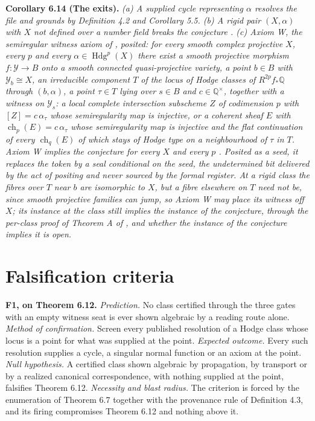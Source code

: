 \documentclass[10pt,twocolumn]{article}
\begin{document}
\textbf{Corollary 6.14 (The exits).} \emph{(a) A supplied cycle
representing \(\alpha\) resolves the file and grounds by Definition 4.2
and Corollary 5.5. (b) A rigid pair \((X,\alpha)\) with \(X\) not
defined over a number field breaks the conjecture \cite{voisin2016}. (c)
Axiom W, the semiregular witness axiom of \cite{islam2026w}, posited:
for every smooth complex projective \(X\), every \(p\) and every
\(\alpha\in\operatorname{Hdg}^p(X)\) there exist a smooth projective
morphism \(f\colon\mathcal{Y}\to B\) onto a smooth connected
quasi-projective variety, a point \(b\in B\) with
\(\mathcal{Y}_b\cong X\), an irreducible component \(T\) of the locus of
Hodge classes of \(R^{2p}f_*\mathbb{Q}\) through \((b,\alpha)\), a point
\(\tau\in T\) lying over \(s\in B\) and \(c\in\mathbb{Q}^\times\),
together with a witness on \(\mathcal{Y}_s\): a local complete
intersection subscheme \(Z\) of codimension \(p\) with
\([Z]=c\,\alpha_\tau\) whose semiregularity map is injective, or a
coherent sheaf \(E\) with \(\operatorname{ch}_p(E)=c\,\alpha_\tau\)
whose semiregularity map is injective and the flat continuation of every
\(\operatorname{ch}_q(E)\) of which stays of Hodge type on a
neighbourhood of \(\tau\) in \(T\). Axiom W implies the conjecture for
every \(X\) and every \(p\) \cite{islam2026w}. Posited as a seed, it
replaces the token by a seal conditional on the seed, the undetermined
bit delivered by the act of positing and never sourced by the formal
register. At a rigid class the fibres over \(T\) near \(b\) are
isomorphic to \(X\), but a fibre elsewhere on \(T\) need not be, since
smooth projective families can jump, so Axiom W may place its witness
off \(X\); its instance at the class still implies the instance of the
conjecture, through the per-class proof of Theorem A of
\cite{islam2026w}, and whether the instance of the conjecture implies it
is open.}

\hypertarget{falsification-criteria}{%
\section{Falsification criteria}\label{falsification-criteria}}

\textbf{F1, on Theorem 6.12.} \emph{Prediction.} No class certified
through the three gates with an empty witness seat is ever shown
algebraic by a reading route alone. \emph{Method of confirmation.}
Screen every published resolution of a Hodge class whose locus is a
point for what was supplied at the point. \emph{Expected outcome.} Every
such resolution supplies a cycle, a singular normal function or an axiom
at the point. \emph{Null hypothesis.} A certified class shown algebraic
by propagation, by transport or by a realized canonical correspondence,
with nothing supplied at the point, falsifies Theorem 6.12.
\emph{Necessity and blast radius.} The criterion is forced by the
enumeration of Theorem 6.7 together with the provenance rule of
Definition 4.3, and its firing compromises Theorem 6.12 and nothing
above it.
\end{document}
